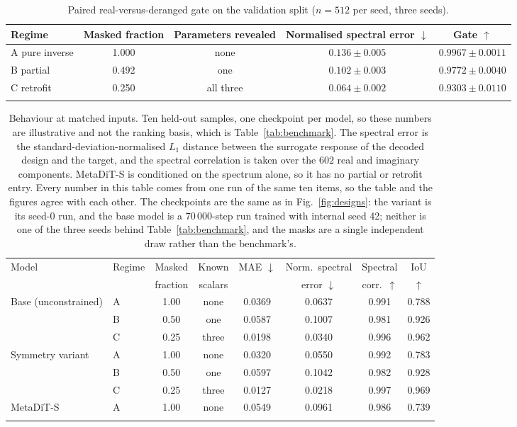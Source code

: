 \documentclass[pdflatex,oneside,sn-mathphys-num]{sn-jnl}
\theoremstyle{thmstyleone}
\theoremstyle{thmstyletwo}
\theoremstyle{thmstylethree}
\begin{document}
\begin{table}[h]
\centering
\caption{Paired real-versus-deranged gate on the validation split ($n=512$ per seed,
three seeds).}\label{tab:gates}
\begin{tabular}{@{}lcccc@{}}
\toprule
Regime & Masked fraction & Parameters revealed & Normalised spectral error $\downarrow$ & Gate $\uparrow$ \\
\midrule
A pure inverse & 1.000 & none & $0.136 \pm 0.005$ & $\mathbf{0.9967 \pm 0.0011}$ \\
B partial & 0.492 & one & $0.102 \pm 0.003$ & $0.9772 \pm 0.0040$ \\
C retrofit & 0.250 & all three & $\mathbf{0.064 \pm 0.002}$ & $0.9303 \pm 0.0110$ \\
\botrule
\end{tabular}
\end{table}

\begin{table}[h]
\centering
\caption{Behaviour at matched inputs. Ten held-out samples, one checkpoint per model, so
these numbers are illustrative and not the ranking basis, which is
Table~\ref{tab:benchmark}. The spectral error is the standard-deviation-normalised $L_1$
distance between the surrogate response of the decoded design and the target, and the
spectral correlation is taken over the $602$ real and imaginary components. MetaDiT-S is
conditioned on the spectrum alone, so it has no partial or retrofit entry. Every number in this table comes from one run of the same ten items, so the table and the
figures agree with each other. The checkpoints are the same as in Fig.~\ref{fig:designs}: the
variant is its seed-0 run, and the base model is a 70\,000-step run trained with internal seed
42; neither is one of the three seeds behind Table~\ref{tab:benchmark}, and the masks are a
single independent draw rather than the benchmark's.}
\label{tab:scenarios}
\footnotesize
\begin{tabular}{@{}llccc ccc@{}}
\toprule
Model & Regime & Masked & Known & MAE $\downarrow$ & Norm.\ spectral & Spectral & IoU \\
 & & fraction & scalars & & error $\downarrow$ & corr.\ $\uparrow$ & $\uparrow$ \\
\midrule
Base (unconstrained) & A & 1.00 & none & 0.0369 & 0.0637 & 0.991 & 0.788 \\
 & B & 0.50 & one & 0.0587 & 0.1007 & 0.981 & 0.926 \\
 & C & 0.25 & three & 0.0198 & 0.0340 & 0.996 & 0.962 \\
\midrule
Symmetry variant & A & 1.00 & none & 0.0320 & 0.0550 & 0.992 & 0.783 \\
 & B & 0.50 & one & 0.0597 & 0.1042 & 0.982 & 0.928 \\
 & C & 0.25 & three & 0.0127 & 0.0218 & 0.997 & 0.969 \\
\midrule
MetaDiT-S~\cite{metadit} & A & 1.00 & none & 0.0549 & 0.0961 & 0.986 & 0.739 \\
\botrule
\end{tabular}
\end{table}
\end{document}

